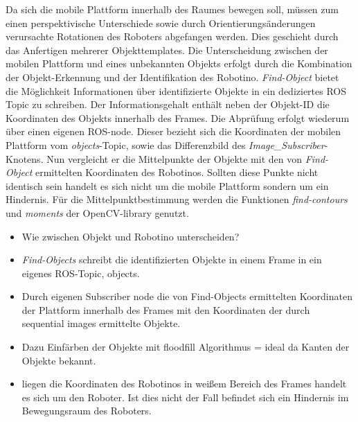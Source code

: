	Da sich die mobile Plattform innerhalb des Raumes bewegen soll, müssen zum einen perspektivische Unterschiede sowie durch Orientierungsänderungen verursachte Rotationen des Roboters abgefangen werden. Dies geschieht durch das Anfertigen mehrerer Objekttemplates.\newline
	Die Unterscheidung zwischen der mobilen Plattform und eines unbekannten Objekts erfolgt durch die Kombination der Objekt-Erkennung und der Identifikation des Robotino. \textit{Find-Object} bietet die Möglichkeit Informationen über identifizierte Objekte in ein dediziertes ROS Topic zu schreiben. Der Informationsgehalt enthält neben der Objekt-ID die Koordinaten des Objekts innerhalb des Frames. Die Abprüfung erfolgt wiederum über einen eigenen ROS-node. Dieser bezieht sich die Koordinaten der mobilen Plattform vom \textit{objects}-Topic, sowie das Differenzbild des \textit{Image\_Subscriber}-Knotens. Nun vergleicht er die Mittelpunkte der Objekte mit den von \textit{Find-Object} ermittelten Koordinaten des Robotinos. Sollten diese Punkte nicht identisch sein handelt es sich nicht um die mobile Plattform sondern um ein Hindernis. Für die Mittelpunktbestimmung werden die Funktionen \textit{find-contours} und \textit{moments} der OpenCV-library genutzt. 
	\begin{itemize}
	\item Wie zwischen Objekt und Robotino unterscheiden?
	\item \textit{Find-Objects} schreibt die identifizierten Objekte in einem Frame in ein eigenes ROS-Topic, objects.
	\item Durch eigenen Subscriber node die von Find-Objects ermittelten Koordinaten der Plattform innerhalb des Frames mit den Koordinaten der durch sequential images ermittelte Objekte.
	\item Dazu Einfärben der Objekte mit floodfill Algorithmus = ideal da Kanten der Objekte bekannt.
	\item liegen die Koordinaten des Robotinos in weißem Bereich des Frames handelt es sich um den Roboter. Ist dies nicht der Fall befindet sich ein Hindernis im Bewegungsraum des Roboters.
	\end{itemize}
	
